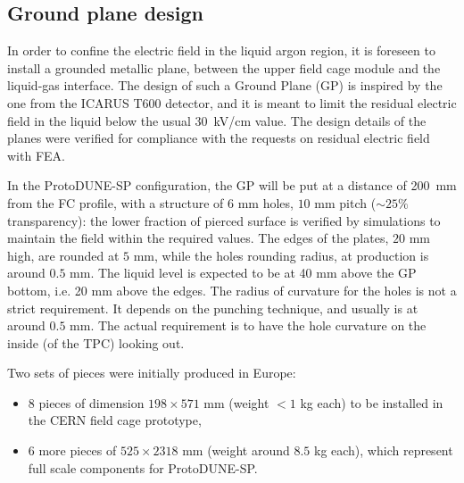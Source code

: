 \subsection{Ground plane design}

In order to confine the electric field in the liquid argon region, it is foreseen to install a grounded metallic plane,  between the upper field cage module and the liquid-gas interface. The design of such a Ground Plane (GP)  is inspired by the one from the ICARUS T600 detector, and it is meant to limit the residual electric field in the liquid below the usual 30~kV/cm value. 
The design details of the planes were verified for compliance with the requests on residual electric field with FEA.  

In the ProtoDUNE-SP configuration, the GP will be put at a distance of 200~mm from the FC profile, with a structure of $6$ mm holes, $10$ mm pitch ($\sim 25\%$ transparency): the lower fraction of pierced surface is verified by simulations to maintain the field within the required values. The edges of the plates, $20$ mm high, are rounded at $5$ mm, while the holes rounding radius, at production is around $0.5$ mm. The liquid level is expected to be at 40 mm above the GP bottom, i.e. 20 mm above the edges. The radius of curvature for the holes is not a strict requirement. It depends on the punching technique, and usually is at around $0.5$ mm. The actual requirement is to have the hole curvature on the inside (of the TPC) looking out.

Two sets of pieces  were initially produced in Europe:
\begin{itemize}
\item 8 pieces of dimension $198 \times 571$ mm (weight $< 1$ kg each) to be installed in the CERN field cage prototype,
\item 6 more pieces of  $525 \times 2318$ mm (weight around $8.5$ kg each), which represent full scale components for ProtoDUNE-SP. %
\end{itemize}




